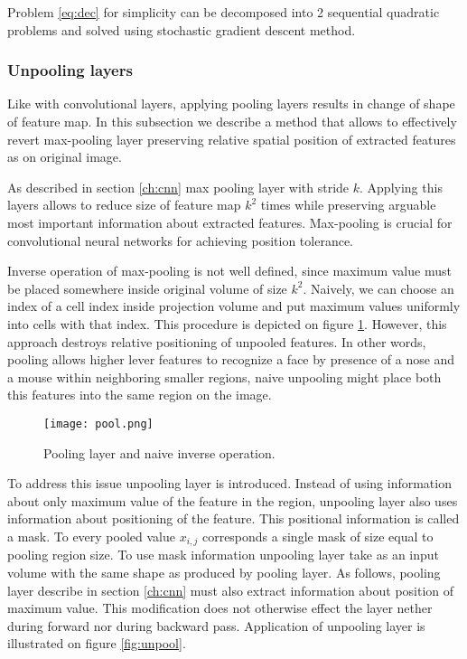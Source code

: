 Problem \ref{eq:dec} for simplicity can be decomposed into 2 sequential quadratic problems and solved using stochastic gradient descent method.

\subsubsection{Unpooling layers}

Like with convolutional layers, applying pooling layers results in change of shape of feature map.
In this subsection we describe a method that allows to effectively revert max-pooling layer preserving relative spatial position of extracted features as on original image.

As described in section \ref{ch:cnn} max pooling layer with stride $k$.
Applying this layers allows to reduce size of feature map $k^2$ times while preserving arguable most important information about extracted features.
Max-pooling is crucial for convolutional neural networks for achieving position tolerance.

Inverse operation of max-pooling is not well defined, since maximum value must be placed somewhere inside original volume of size $k^2$. Naively, we can choose an index of a cell index inside projection volume and put maximum values uniformly into cells with that index.
This procedure is depicted on figure \ref{fig:pool}.
However, this approach destroys relative positioning of unpooled features.
In other words, pooling allows higher lever features to recognize a face by presence of a nose and a mouse within neighboring smaller regions, naive unpooling might place both this features into the same region on the image.

\begin{figure}[h!]
  \centering
    \texttt{[image: pool.png]}
  \caption{Pooling layer and naive inverse operation.}
  \label{fig:pool}
\end{figure}

To address this issue unpooling layer is introduced. Instead of using information about only maximum value of the feature in the region, unpooling layer also uses information about positioning of the feature. This positional information is called a mask. To every pooled value $x_{i,j}$ corresponds a single mask of size equal to pooling region size. To use mask information  unpooling layer take as an input volume with the same shape as produced by pooling layer. As follows, pooling layer describe in section \ref{ch:cnn} must also extract information about position of maximum value. This modification does not otherwise effect the layer nether during forward nor during backward pass. Application of unpooling layer is illustrated on figure \ref{fig:unpool}.

